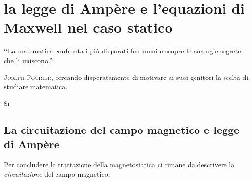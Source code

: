 \chapter{la legge di Ampère e l'equazioni di Maxwell nel caso statico}

\begin{introduction}
	‘‘La matematica confronta i più disparati fenomeni e scopre le analogie segrete che li uniscono.''
	\begin{flushright}
		\textsc{Joseph Fourier,} cercando disperatamente di motivare ai suoi genitori la scelta di studiare matematica. %
	\end{flushright}
\end{introduction}
\lettrine[findent=1pt, nindent=0pt]{S}{i} %

\section{La circuitazione del campo magnetico e legge di Ampère}
Per concludere la trattazione della magnetostatica ci rimane da descrivere la \textit{circuitazione} del campo magnetico.
